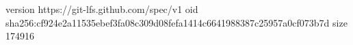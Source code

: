 version https://git-lfs.github.com/spec/v1
oid sha256:cf924e2a11535ebef3fa08c309d08fefa1414c6641988387c25957a0cf073b7d
size 174916
